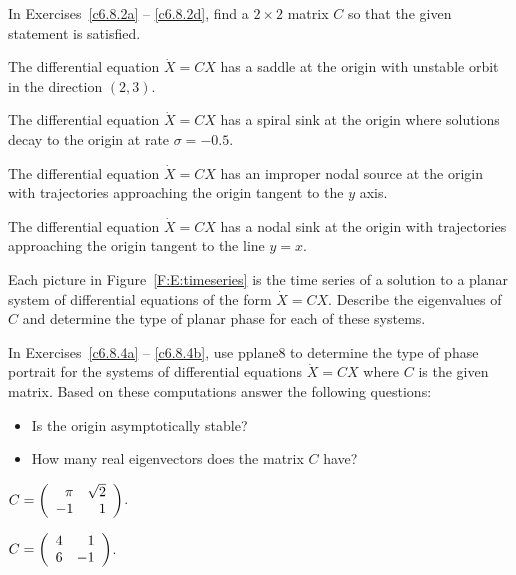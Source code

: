 \documentclass{ximera}
\begin{document}
\noindent In Exercises~\ref{c6.8.2a} -- \ref{c6.8.2d}, find a $2\times 2$
matrix $C$ so that the given statement is satisfied.
\begin{exercise} \label{c6.8.2a}
The differential equation $\dot{X}=CX$ has a saddle at the origin with
unstable orbit in the direction $(2,3)$.
\end{exercise}
\begin{exercise} \label{c6.8.2b}
The differential equation $\dot{X}=CX$ has a spiral sink at the origin
where solutions decay to the origin at rate $\sigma=-0.5$.
\end{exercise}
\begin{exercise} \label{c6.8.2c}
The differential equation $\dot{X}=CX$ has an improper nodal source at the
origin with trajectories approaching the origin tangent to the $y$ axis.
\end{exercise}
\begin{exercise} \label{c6.8.2d}
The differential equation $\dot{X}=CX$ has a nodal sink at the origin with
trajectories approaching the origin tangent to the line $y=x$.
\end{exercise}

\begin{exercise} \label{c6.8.3}
Each picture in Figure~\ref{F:E:timeseries} is the time series of a
solution to a planar system of differential equations of the form
$\dot{X}=CX$.  Describe the eigenvalues of $C$ and determine the type
of planar phase for each of these systems.
\end{exercise}
\begin{figure*}[htb]
        \centerline{%
        }
	\caption{Time series for planar systems.}
	\label{F:E:timeseries}
\end{figure*}


\CEXER

\noindent In Exercises~\ref{c6.8.4a} -- \ref{c6.8.4b}, use {\sf pplane8} to
determine the type of phase portrait for the systems of differential equations
$\dot{X}=CX$ where $C$ is the given matrix.  Based on these computations
answer the following questions:
\begin{itemize}
\item[(a)]  Is the origin asymptotically stable?
\item[(b)]  How many real eigenvectors does the matrix $C$ have?
\end{itemize}
\begin{exercise} \label{c6.8.4a}
$C=\left(\begin{array}{rr} \pi & \sqrt{2}\\ -1 &1\end{array}\right)$.
\end{exercise}
\begin{exercise} \label{c6.8.4b}
$C=\left(\begin{array}{rr} 4 & 1\\ 6 &-1\end{array}\right)$.
\end{exercise}
\end{document}
